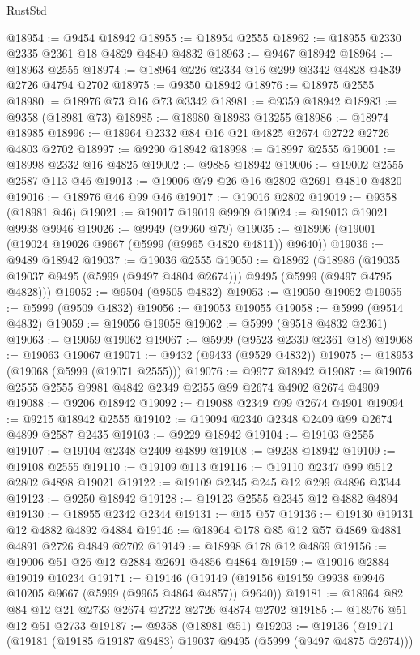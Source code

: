 \begin{lexlean}{RustStd}
\begin{coremodule}
@18954 := @9454 @18942
@18955 := @18954 @2555
@18962 := @18955 @2330 @2335 @2361 @18 @4829 @4840 @4832
@18963 := @9467 @18942
@18964 := @18963 @2555
@18974 := @18964 @226 @2334 @16 @299 @3342 @4828 @4839 @2726 @4794 @2702
@18975 := @9350 @18942
@18976 := @18975 @2555
@18980 := @18976 @73 @16 @73 @3342
@18981 := @9359 @18942
@18983 := @9358 (@18981 @73)
@18985 := @18980 @18983 @13255
@18986 := @18974 @18985
@18996 := @18964 @2332 @84 @16 @21 @4825 @2674 @2722 @2726 @4803 @2702
@18997 := @9290 @18942
@18998 := @18997 @2555
@19001 := @18998 @2332 @16 @4825
@19002 := @9885 @18942
@19006 := @19002 @2555 @2587 @113 @46
@19013 := @19006 @79 @26 @16 @2802 @2691 @4810 @4820
@19016 := @18976 @46 @99 @46
@19017 := @19016 @2802
@19019 := @9358 (@18981 @46)
@19021 := @19017 @19019 @9909
@19024 := @19013 @19021 @9938 @9946
@19026 := @9949 (@9960 @79)
@19035 := @18996 (@19001 (@19024 @19026 @9667 (@5999 (@9965 @4820 @4811)) @9640))
@19036 := @9489 @18942
@19037 := @19036 @2555
@19050 := @18962
    (@18986 (@19035 @19037 @9495 (@5999 (@9497 @4804 @2674))) @9495 (@5999 (@9497 @4795 @4828)))
@19052 := @9504 (@9505 @4832)
@19053 := @19050 @19052
@19055 := @5999 (@9509 @4832)
@19056 := @19053 @19055
@19058 := @5999 (@9514 @4832)
@19059 := @19056 @19058
@19062 := @5999 (@9518 @4832 @2361)
@19063 := @19059 @19062
@19067 := @5999 (@9523 @2330 @2361 @18)
@19068 := @19063 @19067
@19071 := @9432 (@9433 (@9529 @4832))
@19075 := @18953 (@19068 (@5999 (@19071 @2555)))
@19076 := @9977 @18942
@19087 := @19076 @2555 @2555 @9981 @4842 @2349 @2355 @99 @2674 @4902 @2674 @4909
@19088 := @9206 @18942
@19092 := @19088 @2349 @99 @2674 @4901
@19094 := @9215 @18942 @2555
@19102 := @19094 @2340 @2348 @2409 @99 @2674 @4899 @2587 @2435
@19103 := @9229 @18942
@19104 := @19103 @2555
@19107 := @19104 @2348 @2409 @4899
@19108 := @9238 @18942
@19109 := @19108 @2555
@19110 := @19109 @113
@19116 := @19110 @2347 @99 @512 @2802 @4898 @19021
@19122 := @19109 @2345 @245 @12 @299 @4896 @3344
@19123 := @9250 @18942
@19128 := @19123 @2555 @2345 @12 @4882 @4894
@19130 := @18955 @2342 @2344
@19131 := @15 @57
@19136 := @19130 @19131 @12 @4882 @4892 @4884
@19146 := @18964 @178 @85 @12 @57 @4869 @4881 @4891 @2726 @4849 @2702
@19149 := @18998 @178 @12 @4869
@19156 := @19006 @51 @26 @12 @2884 @2691 @4856 @4864
@19159 := @19016 @2884 @19019 @10234
@19171 := @19146 (@19149 (@19156 @19159 @9938 @9946 @10205 @9667 (@5999 (@9965 @4864 @4857)) @9640))
@19181 := @18964 @82 @84 @12 @21 @2733 @2674 @2722 @2726 @4874 @2702
@19185 := @18976 @51 @12 @51 @2733
@19187 := @9358 (@18981 @51)
@19203 := @19136
    (@19171
      (@19181 (@19185 @19187 @9483) @19037 @9495 (@5999 (@9497 @4875 @2674)))

\end{coremodule}
\end{lexlean}
